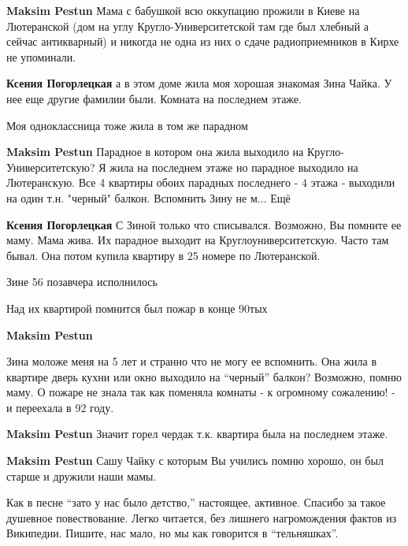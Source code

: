 \begin{itemize}
\begin{itemize}
\begin{itemize} %
\textbf{Maksim Pestun} Мама с бабушкой всю оккупацию прожили в Киеве на Лютеранской (дом на углу Кругло-Университетской там где был хлебный а сейчас антикварный) и никогда не одна из них о сдаче радиоприемников в Кирхе не упоминали.

\textbf{Ксения Погорлецкая} а в этом доме жила моя хорошая знакомая Зина Чайка. У нее еще другие фамилии были. Комната на последнем этаже.

Моя одноклассница тоже жила в том же парадном

\textbf{Maksim Pestun} Парадное в котором она жила выходило на Кругло-Университетскую? Я жила на последнем этаже но парадное выходило на Лютеранскую. Все 4 квартиры обоих парадных последнего - 4 этажа - выходили на один т.н. "черный" балкон. Вспомнить Зину не м... Ещё

\textbf{Ксения Погорлецкая} С Зиной только что списывался. Возможно, Вы помните ее маму. Мама жива. Их парадное выходит на Круглоуниверситетскую. Часто там бывал. Она потом купила квартиру в 25 номере по Лютеранской.

Зине 56 позавчера исполнилось

Над их квартирой помнится был пожар в конце 90тых

\textbf{Maksim Pestun} 

Зина моложе меня на 5 лет и странно что не могу ее вспомнить. Она жила в
квартире дверь кухни или окно выходило на \enquote{черный} балкон? Возможно, помню
маму. О пожаре не знала так как поменяла комнаты - к огромному сожалению! - и
переехала в 92 году.


\textbf{Maksim Pestun} Значит горел чердак т.к. квартира была на последнем этаже.

\textbf{Maksim Pestun} Сашу Чайку с которым Вы учились помню хорошо, он был старше и дружили наши мамы.
\end{itemize} %

\end{itemize} %


Как в песне \enquote{зато у нас было детство,} настоящее, активное. Спасибо за такое
душевное повествование. Легко читается, без лишнего нагромождения фактов из
Википедии. Пишите, нас мало, но мы как говорится в \enquote{тельняшках}.



\end{itemize}
